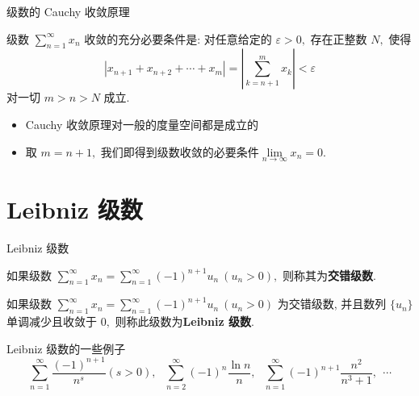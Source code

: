 \begin{frame}{级数的 Cauchy 收敛原理}

\begin{thm}
级数 $\sum\limits_{n=1}^\infty x_n$ 收敛的充分必要条件是: 对任意给定的 $\varepsilon > 0,$ 存在正整数 $N,$ 使得
\[\left\lvert x_{n+1} + x_{n+2} + \cdots + x_m \right\rvert = \left\lvert \sum\limits_{k=n+1}^m x_k \right\rvert < \varepsilon\]
对一切 $m > n > N$ 成立.
\end{thm}

\pause
\vspace{0.6em}

\begin{attnblock}
\begin{itemize}
\item[\ding{43}] Cauchy 收敛原理对一般的度量空间都是成立的
\pause
\item[\ding{43}] 取 $m = n + 1,$ 我们即得到级数收敛的必要条件$\lim\limits_{n\to\infty} x_n = 0.$
\end{itemize}
\end{attnblock}

\end{frame}


\section[Leibniz\\级数]{Leibniz 级数}


\begin{frame}{Leibniz 级数}

\begin{Def}[交错级数]
如果级数 $\sum\limits_{n=1}^\infty x_n = \sum\limits_{n=1}^\infty (-1)^{n+1} u_n ~ (u_n > 0),$ 则称其为\textbf{交错级数}.
\end{Def}

\pause

\begin{Def}[Leibniz 级数]
如果级数 $\sum\limits_{n=1}^\infty x_n = \sum\limits_{n=1}^\infty (-1)^{n+1} u_n ~ (u_n > 0)$ 为交错级数, 并且数列 $\{u_n\}$ 单调减少且收敛于 $0,$ 则称此级数为\textbf{Leibniz 级数}.
\end{Def}

\pause

\begin{block}{Leibniz 级数的一些例子}
\vspace{-1.5em}
\[\sum\limits_{n=1}^\infty \dfrac{(-1)^{n+1}}{n^s} (s > 0), ~~~ \sum\limits_{n=2}^\infty (-1)^{n} \dfrac{\ln{n}}{n}, ~~~ \sum\limits_{n=1}^\infty (-1)^{n+1} \dfrac{n^2}{n^3 + 1}, ~~ \cdots\]
\end{block}

\end{frame}

